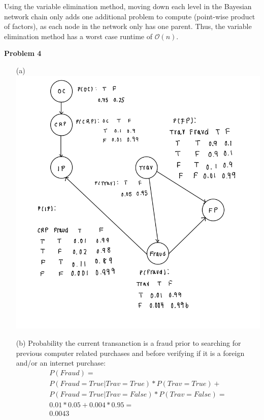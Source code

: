 \documentclass[11pt]{article}
\begin{document}
\begin{enumerate}
        Using the variable elimination method, moving down each level in the Bayesian network
        chain only adds one additional problem to compute (point-wise product of factors), as each node in the
        network only has one parent.
        Thus, the variable elimination method has a worst case
        runtime of $\mathcal{O}(n)$.
    \end{enumerate}

    \begin{center}
        \Large
        \textbf{Problem 4}
    \end{center}
    \normalsize
    \begin{enumerate}
        \item[(a)]
        \includegraphics[width=\linewidth]{images/bayesnetwork} \\
        \item[(b)]
        Probability the current transanction is a fraud prior to searching for previous computer related purchases and before verifying if it is a foreign and/or an internet purchase:\\
        \begin{gather*}
        P(Fraud) = \\P(Fraud = True| Trav = True) * P(Trav = True) + \\P(Fraud = True| Trav = False) * P(Trav = False) =\\ 0.01 * 0.05 + 0.004 * 0.95 = \\0.0043\\
        \end{gather*}
        \\
        

\end{enumerate}
\end{document}
